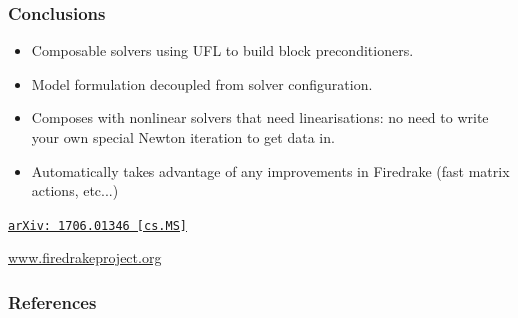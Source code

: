 \documentclass[presentation,aspectratio=43]{beamer}
\newcommand{\arxivlink}[2]{%
  \href{http://www.arxiv.org/abs/#1}%
  {{\small\texttt{arXiv:\,#1\,[#2]}}}%
}
\begin{document}
\begin{frame}
  \frametitle{Conclusions}

  \begin{itemize}
  \item Composable solvers using UFL to build block preconditioners.

  \item Model formulation decoupled from solver configuration.

  \item Composes with nonlinear solvers that need linearisations: no
    need to write your own special Newton iteration to get data in.

  \item Automatically takes advantage of any improvements in Firedrake
    (fast matrix actions, etc...)

  \end{itemize}

  \begin{center}
    \textcite{Kirby:2018} \arxivlink{1706.01346}{cs.MS}

    \url{www.firedrakeproject.org}
  \end{center}
\end{frame}


\appendix
\begin{frame}
  \frametitle{References}
  \printbibliography[heading=none]
\end{frame}
\end{document}
